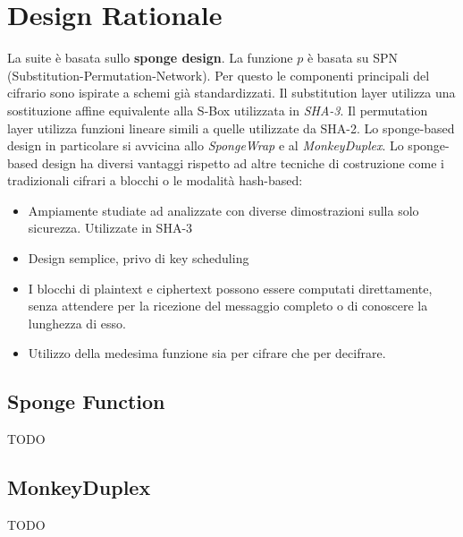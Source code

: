 \section{Design Rationale}
La suite è basata sullo \textbf{sponge design}. La funzione $p$ è basata su SPN (Substitution-Permutation-Network). Per questo le componenti principali del cifrario sono ispirate a schemi già standardizzati. 
\newline\newline
Il substitution layer utilizza una sostituzione affine equivalente alla S-Box utilizzata in \textsl{SHA-3}. Il permutation layer utilizza funzioni lineare simili a quelle utilizzate da SHA-2. 
\newline\newline
Lo sponge-based design in particolare si avvicina allo \textsl{SpongeWrap} e al \textsl{MonkeyDuplex}. Lo sponge-based design ha diversi vantaggi rispetto ad altre tecniche di costruzione come i tradizionali cifrari a blocchi o le modalità hash-based: 
\begin{itemize}
    \item Ampiamente studiate ad analizzate con diverse dimostrazioni sulla solo sicurezza. Utilizzate in SHA-3
    \item Design semplice, privo di key scheduling
    \item I blocchi di plaintext e ciphertext possono essere computati direttamente, senza attendere per la ricezione del messaggio completo o di conoscere la lunghezza di esso. 
    \item Utilizzo della medesima funzione sia per cifrare che per decifrare. 
\end{itemize} 
\subsection{Sponge Function}
TODO
\subsection{MonkeyDuplex}
TODO
\newpage